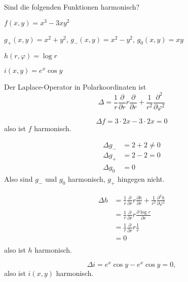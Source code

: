 Sind die folgenden Funktionen harmonisch?
\begin{teilaufgaben}
\item $f(x,y)=x^3-3xy^2$
\item $g_+(x,y)=x^2+y^2$, $g_-(x,y)=x^2-y^2$, $g_0(x,y)=xy$
\item $h(r,\varphi)=\log r$
\item $i(x,y)=e^x\cos y$
\end{teilaufgaben}

\begin{hinweis}
Der Laplace-Operator in Polarkoordinaten ist
\[
\Delta =
\frac1r\frac{\partial}{\partial r}r\frac{\partial}{\partial r}
+
\frac1{r^2}\frac{\partial^2}{\partial\varphi^2}
\]
\end{hinweis}

\begin{loesung}
\begin{teilaufgaben}
\item
\[
\Delta f
=
3\cdot 2x-3\cdot 2x=0
\]
also ist $f$ harmonisch.
\item
\begin{align*}
\Delta g_-
&=
2+2\ne 0
\\
\Delta g_+
&=
2-2=0
\\
\Delta g_0
&=
0
\end{align*}
Also sind $g_-$ und $g_0$ harmonisch, $g_+$ hingegen nicht.
\item
\begin{align*}
\Delta h&=
\frac1r\frac{\partial}{\partial r}r\frac{\partial h}{\partial r}
+
\frac1{r^2}\frac{\partial^2 h}{\partial\varphi^2}
\\
&=
\frac1r\frac{\partial}{\partial r}r\frac{\partial \log r}{\partial r}
\\
&=
\frac1r\frac{\partial}{\partial r}r\frac1r
\\
&=0
\\
\end{align*}
also ist $h$ harmonisch.
\item
\[
\Delta i=e^x\cos y-e^x\cos y=0,
\]
also ist $i(x,y)$ harmonisch.
\end{teilaufgaben}
\end{loesung}
